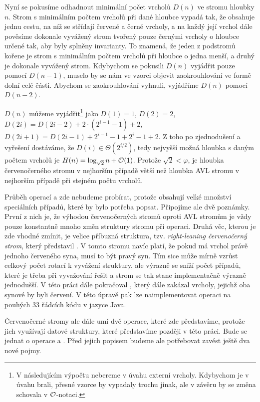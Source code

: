 Nyní se pokusíme odhadnout minimální počet vrcholů $D(n)$ ve stromu hloubky $n$. Strom s minimálním počtem vrcholů při dané hloubce vypadá tak, že obsahuje jednu cestu, na níž se střídají červené a černé vrcholy, a na každý její vrchol dále pověsíme dokonale vyvážený strom tvořený pouze černými vrcholy o hloubce určené tak, aby byly splněny invarianty. To znamená, že jeden z podstromů kořene je strom s minimálním počtem vrcholů při hloubce o jedna menší, a druhý je dokonale vyvážený strom. Kdybychom se pokusili $D(n)$ vyjádřit pouze pomocí $D(n-1)$, muselo by se nám ve vzorci objevit zaokrouhlování ve formě dolní celé části. Abychom se zaokrouhlování vyhnuli, vyjádříme $D(n)$ pomocí $D(n-2)$.

$D(n)$ můžeme vyjádřit\footnote{V následujícím výpočtu nebereme v úvahu externí vrcholy. Kdybychom je v úvahu brali, přesné vzorce by vypadaly trochu jinak, ale v závěru by se změna schovala v $\mathcal O$-notaci.} jako $D(1)=1$, $D(2) = 2$, $D(2i) = D(2i-2) + 2 \cdot
(2^{i - 1} - 1) + 2$, $D(2i + 1) = D(2i - 1) + 2^{i-1}-1 + 2^i-1 + 2$. Z toho
po zjednodušení a vyřešení dostáváme, že $D(i)\in\Theta(2^{i/2})$, tedy nejvyšší
možná hloubka s daným počtem vrcholů je $H(n) = \log_{\sqrt 2} n + \mathcal O(1)$.
Protože  $\sqrt 2 < \varphi$, je hloubka červenočerného stromu v nejhorším
případě větší než hloubka AVL stromu v nejhorším případě při stejném počtu
vrcholů.

Průběh operací  a  zde nebudeme probírat, protože obsahují velké
množství speciálních případů, které by bylo potřeba popsat. Připojíme ale
dvě poznámky. První z nich je, že výhodou červenočerných stromů oproti AVL
stromům je vždy pouze konstantně mnoho změn struktury stromu při operaci. Druhá
věc, kterou je zde vhodné zmínit, je velice příbuzná struktura, tzv.
\emph{right-leaning červenočerný strom}, který představil \citet{rightleaning}.
V tomto stromu navíc platí, že pokud má vrchol právě jednoho červeného syna,
musí to být pravý syn. Tím sice může mírně vzrůst celkový počet rotací k
vyvážení struktury, ale výrazně se sníží počet případů, které je třeba při
vyvažování řešit a strom se tak stane implementačně výrazně jednodušší. V této
práci dále pokračoval \citet{leftleaning}, který dále zakázal vrcholy, jejichž
oba synové by byli červení. V této úpravě pak lze naimplementovat operaci
 na pouhých 33 řádcích kódu v jazyce Java.    

Červenočerné stromy ale dále umí dvě operace, které zde představíme, protože
jich využívají datové struktury, které představíme později v této práci. Bude se jednat o operace \emph{} a \emph{}.
Před jejich popisem budeme ale potřebovat zavést ještě dva nové pojmy.

